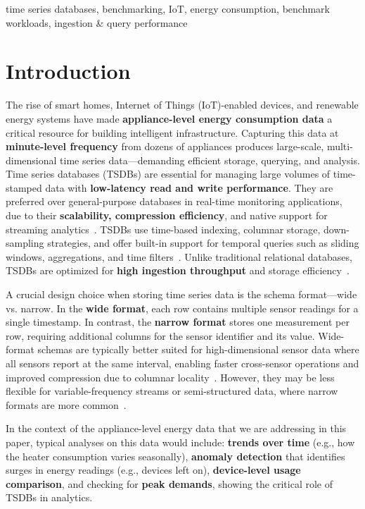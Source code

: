 \documentclass[conference]{IEEEtran}
\begin{document}
\begin{IEEEkeywords}
time series databases, benchmarking, IoT, energy consumption, benchmark workloads, ingestion \& query performance
\end{IEEEkeywords}

\section{Introduction}
The rise of smart homes, Internet of Things (IoT)-enabled devices, and renewable energy systems have made \textbf{appliance-level energy consumption data} a critical resource for building intelligent infrastructure. Capturing this data at \textbf{minute-level frequency} from dozens of appliances produces large-scale, multi-dimensional time series data—demanding efficient storage, querying, and analysis. Time series databases (TSDBs) are essential for managing large volumes of time-stamped data with \textbf{low-latency read and write performance}. They are preferred over general-purpose databases in real-time monitoring applications, due to their \textbf{scalability, compression efficiency}, and native support for streaming analytics~\cite{1_tsmbench2023}. TSDBs use time-based indexing, columnar storage, down-sampling strategies, and offer built-in support for temporal queries such as sliding windows, aggregations, and time filters~\cite{1_tsmbench2023}.  Unlike traditional relational databases, TSDBs are optimized for \textbf{high ingestion throughput} and storage efficiency~\cite{1_tsmbench2023,2_tsmsurvey2017}. 

A crucial design choice when storing time series data is the schema format—wide vs. narrow. In the \textbf{wide format}, each row contains multiple sensor readings for a single timestamp. In contrast, the \textbf{narrow format} stores one measurement per row, requiring additional columns for the sensor identifier and its value. Wide-format schemas are typically better suited for high-dimensional sensor data where all sensors report at the same interval, enabling faster cross-sensor operations and improved compression due to columnar locality~\cite{6_clickbench}. However, they may be less flexible for variable-frequency streams or semi-structured data, where narrow formats are more common~\cite{2_tsmsurvey2017}.

In the context of the appliance-level energy data that we are addressing in this paper, typical analyses on this data would include: \textbf{trends over time} (e.g., how the heater consumption varies seasonally), \textbf{anomaly detection} that identifies surges in energy readings (e.g., devices left on), \textbf{device-level usage comparison}, and checking for \textbf{peak demands}, showing the critical role of TSDBs in analytics. 
\end{document}
